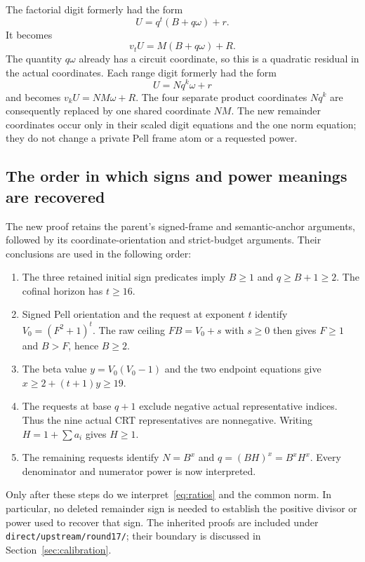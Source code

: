\documentclass[11pt,letterpaper]{article}
\theoremstyle{remark}\newtheorem{remark}[theorem]{Remark}
\newcommand{\file}[1]{\nolinkurl{#1}}
\begin{document}
The factorial digit formerly had the form
\[
 U=q^t(B+q\omega)+r.
\]
It becomes
\[
 v_tU=M(B+q\omega)+R.
\]
The quantity $q\omega$ already has a circuit coordinate, so this is a
quadratic residual in the actual coordinates. Each range digit formerly
had the form
\[
 U=Nq^k\omega+r
\]
and becomes $v_kU=NM\omega+R$. The four separate product coordinates
$Nq^k$ are consequently replaced by one shared coordinate $NM$.
The new remainder coordinates occur only in their scaled digit equations
and the one norm equation; they do not change a private Pell frame atom
or a requested power.

\subsection{The order in which signs and power meanings are recovered}

The new proof retains the parent's signed-frame and semantic-anchor
arguments, followed by its coordinate-orientation and strict-budget
arguments. Their conclusions are used in the following order:

\begin{enumerate}
\item The three retained initial sign predicates imply $B\ge1$ and
      $q\ge B+1\ge2$. The cofinal horizon has $t\ge16$.
\item Signed Pell orientation and the request at exponent $t$ identify
      $V_0=(F^2+1)^t$. The raw ceiling $FB=V_0+s$ with $s\ge0$ then
      gives $F\ge1$ and $B>F$, hence $B\ge2$.
\item The beta value $y=V_0(V_0-1)$ and the two endpoint equations give
      $x\ge2+(t+1)y\ge19$.
\item The requests at base $q+1$ exclude negative actual representative
      indices. Thus the nine actual CRT representatives are nonnegative.
      Writing $H=1+\sum a_i$ gives $H\ge1$.
\item The remaining requests identify $N=B^x$ and
      $q=(BH)^x=B^xH^x$. Every denominator and numerator power is now
      interpreted.
\end{enumerate}

Only after these steps do we interpret~\eqref{eq:ratios} and the common
norm. In particular, no deleted remainder sign is needed to establish
the positive divisor or power used to recover that sign. The inherited
proofs are included under \file{direct/upstream/round17/}; their boundary
is discussed in Section~\ref{sec:calibration}.
\end{document}
